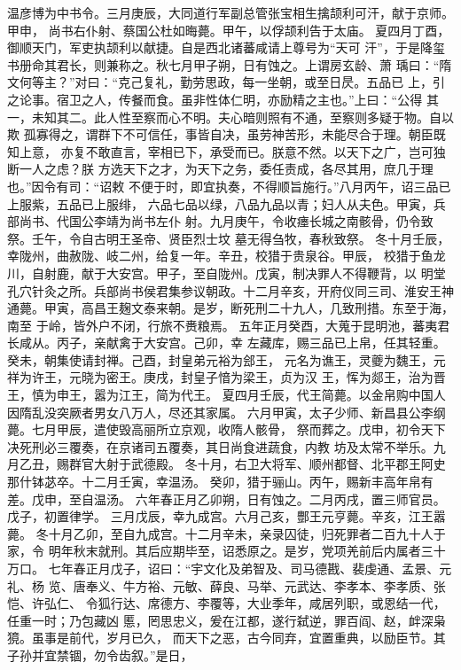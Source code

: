 \documentclass[12pt,UTF8]{ctexbook}
\begin{document}
温彦博为中书令。三月庚辰，大同道行军副总管张宝相生擒颉利可汗，献于京师。甲申，
尚书右仆射、蔡国公杜如晦薨。甲午，以俘颉利告于太庙。
夏四月丁酉，御顺天门，军吏执颉利以献捷。自是西北诸蕃咸请上尊号为“天可
汗”，于是降玺书册命其君长，则兼称之。秋七月甲子朔，日有蚀之。上谓房玄龄、萧
瑀曰：“隋文何等主？”对曰：“克己复礼，勤劳思政，每一坐朝，或至日昃。五品已
上，引之论事。宿卫之人，传餐而食。虽非性体仁明，亦励精之主也。”上曰：“公得
其一，未知其二。此人性至察而心不明。夫心暗则照有不通，至察则多疑于物。自以欺
孤寡得之，谓群下不可信任，事皆自决，虽劳神苦形，未能尽合于理。朝臣既知上意，
亦复不敢直言，宰相已下，承受而已。朕意不然。以天下之广，岂可独断一人之虑？朕
方选天下之才，为天下之务，委任责成，各尽其用，庶几于理也。”因令有司：“诏敕
不便于时，即宜执奏，不得顺旨施行。”八月丙午，诏三品已上服紫，五品已上服绯，
六品七品以绿，八品九品以青；妇人从夫色。甲寅，兵部尚书、代国公李靖为尚书左仆
射。九月庚午，令收瘗长城之南骸骨，仍令致祭。壬午，令自古明王圣帝、贤臣烈士坟
墓无得刍牧，春秋致祭。
冬十月壬辰，幸陇州，曲赦陇、岐二州，给复一年。辛丑，校猎于贵泉谷。甲辰，
校猎于鱼龙川，自射鹿，献于大安宫。甲子，至自陇州。戊寅，制决罪人不得鞭背，以
明堂孔穴针灸之所。兵部尚书侯君集参议朝政。十二月辛亥，开府仪同三司、淮安王神
通薨。甲寅，高昌王麹文泰来朝。是岁，断死刑二十九人，几致刑措。东至于海，南至
于岭，皆外户不闭，行旅不赉粮焉。
五年正月癸酉，大蒐于昆明池，蕃夷君长咸从。丙子，亲献禽于大安宫。己卯，幸
左藏库，赐三品已上帛，任其轻重。癸未，朝集使请封禅。己酉，封皇弟元裕为郐王，
元名为谯王，灵夔为魏王，元祥为许王，元晓为密王。庚戌，封皇子愔为梁王，贞为汉
王，恽为郯王，治为晋王，慎为申王，嚣为江王，简为代王。
夏四月壬辰，代王简薨。以金帛购中国人因隋乱没突厥者男女八万人，尽还其家属。
六月甲寅，太子少师、新昌县公李纲薨。七月甲辰，遣使毁高丽所立京观，收隋人骸骨，
祭而葬之。戊申，初令天下决死刑必三覆奏，在京诸司五覆奏，其日尚食进蔬食，内教
坊及太常不举乐。九月乙丑，赐群官大射于武德殿。
冬十月，右卫大将军、顺州都督、北平郡王阿史那什钵苾卒。十二月壬寅，幸温汤。
癸卯，猎于骊山。丙午，赐新丰高年帛有差。戊申，至自温汤。
六年春正月乙卯朔，日有蚀之。二月丙戌，置三师官员。戊子，初置律学。
三月戊辰，幸九成宫。六月己亥，酆王元亨薨。辛亥，江王嚣薨。
冬十月乙卯，至自九成宫。十二月辛未，亲录囚徒，归死罪者二百九十人于家，令
明年秋末就刑。其后应期毕至，诏悉原之。是岁，党项羌前后内属者三十万口。
七年春正月戊子，诏曰：“宇文化及弟智及、司马德戡、裴虔通、孟景、元礼、杨
览、唐奉义、牛方裕、元敏、薛良、马举、元武达、李孝本、李孝质、张恺、许弘仁、
令狐行达、席德方、李覆等，大业季年，咸居列职，或恩结一代，任重一时；乃包藏凶
慝，罔思忠义，爰在江都，遂行弑逆，罪百阎、赵，衅深枭獍。虽事是前代，岁月已久，
而天下之恶，古今同弃，宜置重典，以励臣节。其子孙并宜禁锢，勿令齿叙。”是日，
\end{document}
